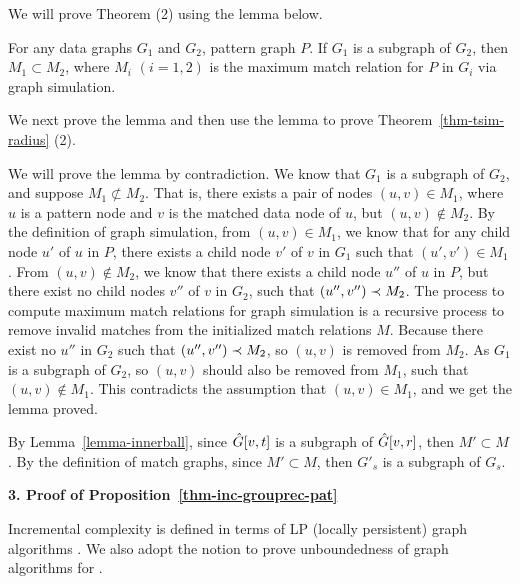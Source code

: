 \vspace{-1ex}	
We will prove Theorem (2) using the lemma below. 

\vspace{-2.7ex}
\begin{lemma}
	\label{lemma-innerball}
	For any data graphs $G_1$ and $G_2$, pattern graph $P$. If $G_1$ is a subgraph of $G_2$,
	then $M_1 \subset M_2$, where $M_i$ $(i=1,2)$ is the maximum match relation for $P$ in $G_i$ via graph simulation. 
\end{lemma}
\vspace{-2.5ex}

We next prove the lemma and then use the lemma to prove Theorem~\ref{thm-tsim-radius} (2).

\vspace{-1.3ex}
 We will prove the lemma by contradiction. 
We know that $G_1$ is a subgraph of $G_2$, and suppose $M_1 \not\subset M_2$.
That is, there exists a pair of nodes $(u, v) \in M_1$, where $u$ is a pattern node 
and $v$ is the matched data node of $u$, but $(u, v) \not\in M_2$.
By the definition of graph simulation, from $(u, v) \in M_1$, we know that for any child node $u'$ of $u$ in $P$,
there exists a child node $v'$ of $v$ in $G_1$ such that $(u', v') \in M_1$.
From $(u, v) \not\in M_2$, we know that there exists a child node $u''$ of $u$ in $P$, 
but there exist no child nodes $v''$ of $v$ in $G_2$, such that $(u'', v'') \prec M_2$.
The process to compute maximum match relations for graph simulation is a recursive process to 
remove invalid matches from the initialized match relations $M$.
Because there exist no $u''$ in $G_2$ such that $(u'', v'') \prec M_2$, so $(u, v)$ is removed from $M_2$.
As $G_1$ is a subgraph of $G_2$, so $(u, v)$ should also be removed from $M_1$, 
such that $(u, v) \not\in M_1$.
This contradicts the assumption that $(u, v) \in M_1$, and we get the lemma proved.
\eop

\vspace{-1.5ex}
By Lemma~\ref{lemma-innerball}, since $\hat{G}{[v, t]}$ is a subgraph of $\hat{G}{[v, r]}$, then $M' \subset M$.
By the definition of match graphs, since $M' \subset M$, then $G'_s$ is a subgraph of $G_s$.


\noindent
{\textbf{3. Proof of Proposition~\ref{thm-inc-grouprec-pat}}}

Incremental complexity is defined in terms of LP (locally persistent) graph algorithms \cite{Reps96}.
We also adopt the notion to prove unboundedness of graph algorithms for \dynteamF.


